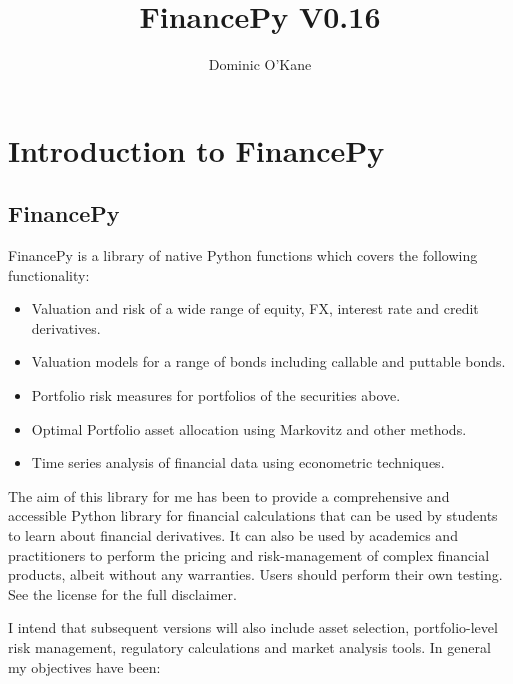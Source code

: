 \documentclass[twoside,11pt]{book}
\begin{document}
\title{{\Huge \bf FinancePy V0.16}}
\author{Dominic O'Kane}

\maketitle 

\cleardoublepage

\setcounter{tocdepth}{1}
\tableofcontents

\setcounter{page}{1}

\chapter{Introduction to FinancePy}

\section*{FinancePy}

FinancePy is a library of native Python functions which covers the following functionality:

\begin{itemize}
\item{ Valuation and risk of a wide range of equity, FX, interest rate and credit derivatives.
}
\item{ Valuation models for a range of bonds including callable and puttable bonds.
}
\item{ Portfolio risk measures for portfolios of the securities above.
}
\item{ Optimal Portfolio asset allocation using Markovitz and other methods.
}
\item{ Time series analysis of financial data using econometric techniques.
}
\end{itemize}

The aim of this library for me has been to provide a comprehensive and accessible Python library for financial calculations that can be used by students to learn about financial derivatives. It can also be used by academics and practitioners to perform the pricing and risk-management of complex financial products, albeit without any warranties. Users should perform their own testing. See the license for the full disclaimer.

I intend that subsequent versions will also include asset selection, portfolio-level risk management, regulatory calculations and market analysis tools. In general my objectives have been:
\end{document}
